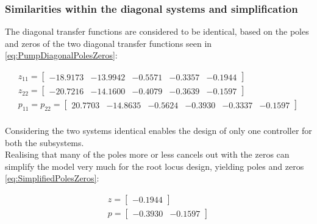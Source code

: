 \subsubsection{Similarities within the diagonal systems and simplification}
The diagonal transfer functions are considered to be identical, based on the poles and zeros of the two diagonal transfer functions seen in \cref{eq:PumpDiagonalPolesZeros}: 

\begin{equation}\label{eq:PumpDiagonalPolesZeros}
	\begin{gathered}
		z_{11} = \begin{bmatrix}-18.9173&  -13.9942&   -0.5571&   -0.3357&   -0.1944 \end{bmatrix} \\
		z_{22} = \begin{bmatrix}-20.7216&  -14.1600&   -0.4079&   -0.3639&   -0.1597 \end{bmatrix} \\
		p_{11} = p_{22} = \begin{bmatrix} 20.7703&  -14.8635&   -0.5624&   -0.3930&   -0.3337&   -0.1597 \end{bmatrix} \\
	\end{gathered}
\end{equation}

Considering the two systems identical enables the design of only one controller for both the subsystems.\\
Realising that many of the poles more or less cancels out with the zeros can simplify the model very much for the root locus design, yielding poles and zeros \cref{eq:SimplifiedPolesZeros}:

 \begin{equation}\label{eq:SimplifiedPolesZeros}
 	\begin{gathered}
 		z = \begin{bmatrix}  -0.1944 \end{bmatrix} \\
 		p = \begin{bmatrix}  -0.3930&  -0.1597 \end{bmatrix} \\
 	\end{gathered}
 \end{equation}

